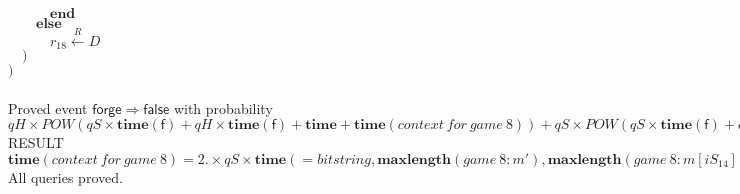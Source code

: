\documentclass{article}
\newcommand{\store}{\leftarrow}
\newcommand{\getR}{\stackrel{R}{\store}}
\newcommand{\kw}[1]{\mathbf{#1}}
\newcommand{\kwf}[1]{\mathsf{#1}}
\newcommand{\var}[1]{\mathit{#1}}
\newcommand{\kwt}[1]{\mathit{#1}}
\newcommand{\kwp}[1]{\mathit{#1}}
\begin{document}
\begin{tabbing}
$\quad \quad \quad \kw{end}$\\
$\quad \quad \kw{else}$\\
$\quad \quad \quad \var{r}_{18} \getR \kwt{D}$\\
$\quad )$\\
$)$\\
$ $\\
\\
Proved event $\kwf{forge} \Longrightarrow \kwf{false}$ with probability $\kwp{qH} \times \var{POW}(\kwp{qS} \times \kw{time}(\kwf{f}) + \kwp{qH} \times \kw{time}(\kwf{f}) + \kw{time} + \kw{time}(\mathit{context\ for\ game}\ 8)) + \kwp{qS} \times \var{POW}(\kwp{qS} \times \kw{time}(\kwf{f}) + \kwp{qH} \times \kw{time}(\kwf{f}) + \kw{time} + \kw{time}(\mathit{context\ for\ game}\ 8)) + \var{POW}(\kwp{qS} \times \kw{time}(\kwf{f}) + \kwp{qH} \times \kw{time}(\kwf{f}) + \kw{time} + \kw{time}(\mathit{context\ for\ game}\ 8))$\\
RESULT $\kw{time}(\mathit{context\ for\ game}\ 8) = 2. \times \kwp{qS} \times \kw{time}(\kwf{=} bitstring, \kw{maxlength}(\mathit{game}\ 8: \var{m'}), \kw{maxlength}(\mathit{game}\ 8: \var{m}[\var{iS}_{14}])) + \kwp{qH} \times \kw{time}(\kwf{=} bitstring, \kw{maxlength}(\mathit{game}\ 8: \var{m'}), \kw{maxlength}(\mathit{game}\ 8: \var{x}[\var{iH}_{13}])) + \kwp{qH} \times \kw{time}(\kwf{=} bitstring, \kw{maxlength}(\mathit{game}\ 8: \var{m}[\var{iS}_{14}]), \kw{maxlength}(\mathit{game}\ 8: \var{x}[\var{iH}_{13}])) \times \kwp{qS} + \kwp{qS} \times \kwp{qS} \times \kw{time}(\kwf{=} bitstring, \kw{maxlength}(\mathit{game}\ 8: \var{m}[\var{iS}_{14}]), \kw{maxlength}(\mathit{game}\ 8: \var{m}[\var{iS}_{14}])) + \kw{time}(\kwf{=} bitstring, \kw{maxlength}(\mathit{game}\ 8: \var{m}[\var{iS}_{14}]), \kw{maxlength}(\mathit{game}\ 8: \var{m'})) \times \kwp{qS} + \kwp{qH} \times \kwp{qH} \times \kw{time}(\kwf{=} bitstring, \kw{maxlength}(\mathit{game}\ 8: \var{x}[\var{iH}_{13}]), \kw{maxlength}(\mathit{game}\ 8: \var{x}[\var{iH}_{13}])) + \kwp{qS} \times \kw{time}(\kwf{=} bitstring, \kw{maxlength}(\mathit{game}\ 8: \var{x}[\var{iH}_{13}]), \kw{maxlength}(\mathit{game}\ 8: \var{m}[\var{iS}_{14}])) \times \kwp{qH} + \kw{time}(\kwf{=} bitstring, \kw{maxlength}(\mathit{game}\ 8: \var{x}[\var{iH}_{13}]), \kw{maxlength}(\mathit{game}\ 8: \var{m'})) \times \kwp{qH}$\\
All queries proved.\\

\end{tabbing}
\end{document}
